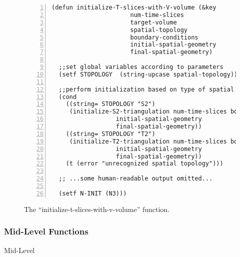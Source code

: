\documentclass[12pt]{article}
\begin{document}
\begin{figure}[htb]
\begin{small}
\begin{lstlisting}[numbers=left]
(defun initialize-T-slices-with-V-volume (&key 
					  num-time-slices
					  target-volume
					  spatial-topology
					  boundary-conditions
					  initial-spatial-geometry
					  final-spatial-geometry)

  ;;set global variables according to parameters
  (setf STOPOLOGY  (string-upcase spatial-topology))

  ;;perform initialization based on type of spatial topology
  (cond 
    ((string= STOPOLOGY "S2")
     (initialize-S2-triangulation num-time-slices boundary-conditions 
				  initial-spatial-geometry
				  final-spatial-geometry))
    ((string= STOPOLOGY "T2") 
     (initialize-T2-triangulation num-time-slices boundary-conditions
				  initial-spatial-geometry
				  final-spatial-geometry))
    (t (error "unrecognized spatial topology")))
  
  ;; ...some human-readable output omitted... 

  (setf N-INIT (N3)))
\end{lstlisting}
\end{small}
\caption{The ``initialize-t-slices-with-v-volume'' function.}
\label{f:itswvv}
\end{figure}

\subsubsection{Mid-Level Functions}
\label{s:initialization:mid-level-functions}

Mid-Level
\end{document}
